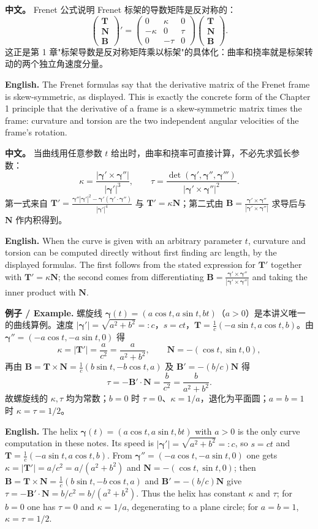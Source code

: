 \documentclass[UTF8,11pt,a4paper]{ctexart}
\newcommand{\APS}[2]{\par\noindent\textbf{中文。} #1\par\noindent\textbf{English.} #2\par\smallskip}
\newcommand{\EN}[1]{\par\noindent \textbf{English.} #1\par}
\newcommand{\EX}[2]{\par\noindent \textbf{例子 / Example.} #1\par\EN{#2}}
\newcommand{\bT}{\mathbf{T}}
\newcommand{\bN}{\mathbf{N}}
\newcommand{\bB}{\mathbf{B}}
\newcommand{\bgamma}{\boldsymbol{\gamma}}
\begin{document}
\APS{Frenet 公式说明 Frenet 标架的导数矩阵是反对称的：
\[
\begin{pmatrix}\bT\\ \bN\\ \bB\end{pmatrix}'
=\begin{pmatrix}0&\kappa&0\\ -\kappa&0&\tau\\ 0&-\tau&0\end{pmatrix}
\begin{pmatrix}\bT\\ \bN\\ \bB\end{pmatrix}.
\]
这正是第 1 章"标架导数是反对称矩阵乘以标架"的具体化：曲率和挠率就是标架转动的两个独立角速度分量。}{The Frenet formulas say that the derivative matrix of the Frenet frame is skew-symmetric, as displayed. This is exactly the concrete form of the Chapter 1 principle that the derivative of a frame is a skew-symmetric matrix times the frame: curvature and torsion are the two independent angular velocities of the frame's rotation.}
\APS{当曲线用任意参数 $t$ 给出时，曲率和挠率可直接计算，不必先求弧长参数：
\[
\kappa=\frac{|\bgamma'\times\bgamma''|}{|\bgamma'|^3},\qquad
\tau=\frac{\det(\bgamma',\bgamma'',\bgamma''')}{|\bgamma'\times\bgamma''|^2}.
\]
第一式来自 $\bT'=\frac{\bgamma''|\bgamma'|^2-\bgamma'(\bgamma'\cdot\bgamma'')}{|\bgamma'|^4}$ 与 $\bT'=\kappa\bN$；第二式由 $\bB=\frac{\bgamma'\times\bgamma''}{|\bgamma'\times\bgamma''|}$ 求导后与 $\bN$ 作内积得到。}{When the curve is given with an arbitrary parameter $t$, curvature and torsion can be computed directly without first finding arc length, by the displayed formulas. The first follows from the stated expression for $\bT'$ together with $\bT'=\kappa\bN$; the second comes from differentiating $\bB=\frac{\bgamma'\times\bgamma''}{|\bgamma'\times\bgamma''|}$ and taking the inner product with $\bN$.}
\EX{螺旋线 $\bgamma(t)=(a\cos t,a\sin t,bt)$（$a>0$）是本讲义唯一的曲线算例。速度 $|\bgamma'|=\sqrt{a^2+b^2}=:c$，$s=ct$，$\bT=\frac1c(-a\sin t,a\cos t,b)$。由 $\bgamma''=(-a\cos t,-a\sin t,0)$ 得
\[
\kappa=|\bT'|=\frac{a}{c^2}=\frac{a}{a^2+b^2},\qquad \bN=-(\cos t,\sin t,0),
\]
再由 $\bB=\bT\times\bN=\frac1c(b\sin t,-b\cos t,a)$ 及 $\bB'=-(b/c)\bN$ 得
\[
\tau=-\bB'\cdot\bN=\frac{b}{c^2}=\frac{b}{a^2+b^2} .
\]
故螺旋线的 $\kappa,\tau$ 均为常数；$b=0$ 时 $\tau=0$、$\kappa=1/a$，退化为平面圆；$a=b=1$ 时 $\kappa=\tau=1/2$。}{The helix $\bgamma(t)=(a\cos t,a\sin t,bt)$ with $a>0$ is the only curve computation in these notes. Its speed is $|\bgamma'|=\sqrt{a^2+b^2}=:c$, so $s=ct$ and $\bT=\frac1c(-a\sin t,a\cos t,b)$. From $\bgamma''=(-a\cos t,-a\sin t,0)$ one gets $\kappa=|\bT'|=a/c^2=a/(a^2+b^2)$ and $\bN=-(\cos t,\sin t,0)$; then $\bB=\bT\times\bN=\frac1c(b\sin t,-b\cos t,a)$ and $\bB'=-(b/c)\bN$ give $\tau=-\bB'\cdot\bN=b/c^2=b/(a^2+b^2)$. Thus the helix has constant $\kappa$ and $\tau$; for $b=0$ one has $\tau=0$ and $\kappa=1/a$, degenerating to a plane circle; for $a=b=1$, $\kappa=\tau=1/2$.}
\end{document}
